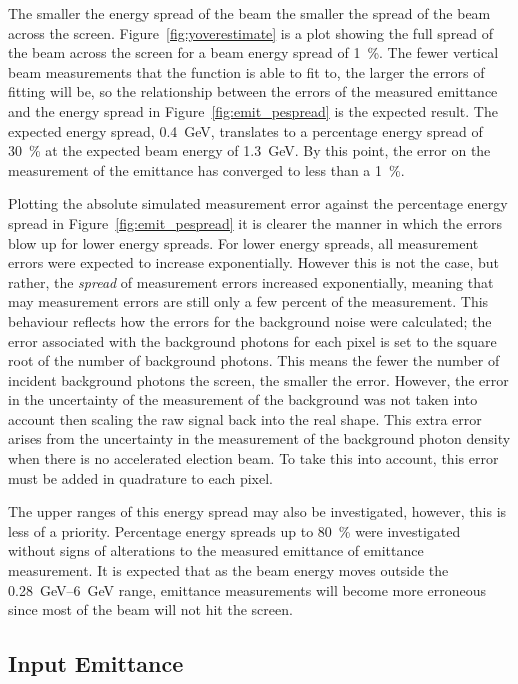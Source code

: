 The smaller the energy spread of the beam the smaller the spread of the beam
across the screen. Figure~\ref{fig:yoverestimate} is a plot showing the full
spread of the beam across the screen for a beam energy spread of
\SI{1}{\percent}. The fewer vertical beam measurements that the function is able
to fit to, the larger the errors of fitting will be, so the relationship between
the errors of the measured emittance and the energy spread in
Figure~\ref{fig:emit_pespread} is the expected result. The expected energy
spread, \SI{0.4}{\giga\electronvolt}, translates to a percentage energy spread
of \SI{30}{\percent} at the expected beam energy of
\SI{1.3}{\giga\electronvolt}. By this point, the error on the measurement of the
emittance has converged to less than a \SI{1}{\percent}.

Plotting the absolute simulated measurement error against the percentage energy
spread in Figure~\ref{fig:emit_pespread} it is clearer the manner in which the
errors blow up for lower energy spreads. 
For lower energy spreads, all measurement errors were expected to increase
exponentially.  However this is not the case, but rather, the \emph{spread} of
measurement errors increased exponentially, meaning that may measurement errors
are still only a few percent of the measurement. This behaviour reflects how the
errors for the background noise were calculated; the error associated with the
background photons for each pixel is set to the square root of the number of
background photons. This means the fewer the number of incident background
photons the screen, the smaller the error. However, the error in the uncertainty
of the measurement of the background was not taken into account then scaling the
raw signal back into the real shape. This extra error arises from the
uncertainty in the measurement of the background photon density when there is no
accelerated election beam. To take this into account, this error must be added
in quadrature to each pixel.

The upper ranges of this energy spread may also be investigated, however, this
is less of a priority. Percentage energy spreads up to \SI{80}{\percent} were
investigated without signs of alterations to the measured emittance of emittance
measurement. It is expected that as the beam energy moves outside the
\SIrange{0.28}{6}{\giga\electronvolt} range, emittance measurements will become
more erroneous since most of the beam will not hit the screen.

\subsection{Input Emittance}

